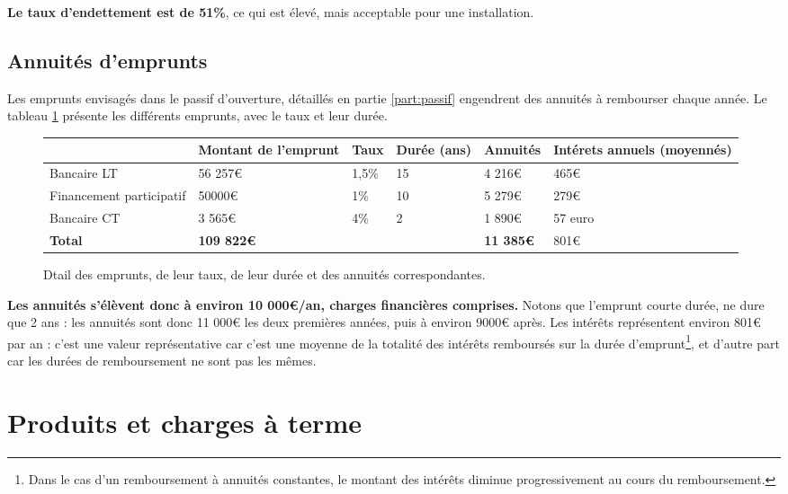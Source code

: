 \documentclass{book}
\begin{document}
\textbf{Le taux d'endettement est de 51\%}, ce qui est élevé, mais acceptable pour une installation.

\subsection{Annuités d'emprunts}

Les emprunts envisagés dans le passif d'ouverture, détaillés en partie \ref{part:passif} engendrent des annuités à rembourser chaque année. Le tableau \ref{tab:annuites} présente les différents emprunts, avec le taux et leur durée.

\begin{figure}[h!]
\footnotesize
\center
\begin{tabular}{ | p{} | p{3cm}| p{1cm}| p{}|p{2cm}| p{}|}
\hline
	& Montant de l'emprunt & Taux & Durée (ans) & Annuités & Intérets annuels (moyennés) \\ \hline
	Bancaire LT & 56 257\euro{} & 1,5\% & 15 & 4 216\euro{} & 465\euro{} \\ \hline
	Financement participatif & 50000\euro{} & 1\% & 10 & 5 279\euro{} & 279\euro{} \\ \hline
	Bancaire CT & 3 565\euro{} & 4\% & 2 & 1 890\euro{}  & 57 euro{} \\ \hline
	\textbf{Total} & \textbf{109 822\euro{}} &  & & \textbf{11 385\euro{}} & 801\euro{} \\ \hline
\end{tabular}
\caption{Dtail des emprunts, de leur taux, de leur durée et des annuités correspondantes.}
\label{tab:annuites}
\end{figure}

\textbf{Les annuités s'élèvent donc à environ 10 000\euro{}/an, charges financières comprises.} Notons que l'emprunt courte durée, ne dure que 2 ans : les annuités sont donc 11 000\euro{} les deux premières années, puis à environ 9000\euro{} après. Les intérêts représentent environ 801\euro{} par an : c'est une valeur représentative car c'est une moyenne de la totalité des intérêts remboursés sur la durée d'emprunt\footnote{Dans le cas d'un remboursement à annuités constantes, le montant des intérêts diminue progressivement au cours du remboursement.}, et d'autre part car les durées de remboursement ne sont pas les mêmes.

\section{Produits et charges à terme}
\end{document}
